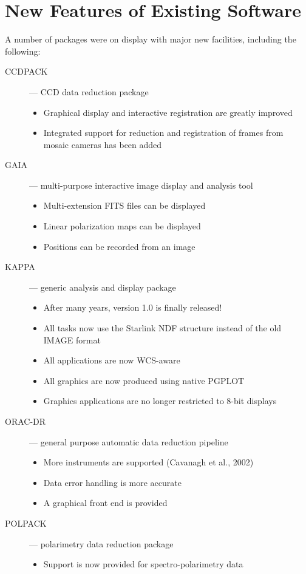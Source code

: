 \section{New Features of Existing Software}

A number of packages were on display with major new facilities,
including the following:
\begin{description}

\item[CCDPACK] --- CCD data reduction package
   \begin{itemize}
   \item Graphical display and interactive registration are greatly improved
   \item Integrated support for reduction and registration of frames 
         from mosaic cameras has been added
   \end{itemize}

\item[GAIA] --- multi-purpose interactive image display and analysis tool
   \begin{itemize}
   \item Multi-extension FITS files can be displayed
   \item Linear polarization maps can be displayed
   \item Positions can be recorded from an image
   \end{itemize}

\item[KAPPA] --- generic analysis and display package
   \begin{itemize}
   \item After many years, version 1.0 is finally released!
   \item All tasks now use the Starlink NDF structure instead of
         the old IMAGE format
   \item All applications are now WCS-aware
   \item All graphics are now produced using native PGPLOT
   \item Graphics applications are no longer restricted to 8-bit displays
   \end{itemize}

\item[ORAC-DR] --- general purpose automatic data reduction pipeline
   \begin{itemize}
   \item More instruments are supported (Cavanagh et al., 2002)
   \item Data error handling is more accurate
   \item A graphical front end is provided
   \end{itemize}

\item[POLPACK] --- polarimetry data reduction package
   \begin{itemize}
   \item Support is now provided for spectro-polarimetry data
   \end{itemize}

\end{description}

